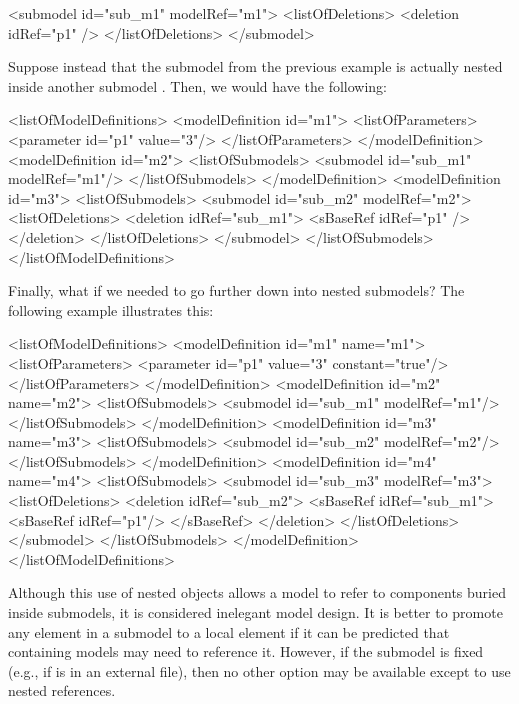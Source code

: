 \begin{example}
<submodel id="sub_m1" modelRef="m1">
  <listOfDeletions>
    <deletion idRef="p1" />
  </listOfDeletions>
</submodel>
\end{example}

Suppose instead that the submodel  from the previous example is actually nested inside another submodel .  Then, we would have the following:

\begin{example}
<listOfModelDefinitions>
  <modelDefinition id="m1">
    <listOfParameters>
      <parameter id="p1" value="3"/>
    </listOfParameters>
  </modelDefinition>
  <modelDefinition id="m2">
    <listOfSubmodels>
      <submodel id="sub_m1" modelRef="m1"/>
    </listOfSubmodels>    
  </modelDefinition>
  <modelDefinition id="m3">
    <listOfSubmodels>
      <submodel id="sub_m2" modelRef="m2">
        <listOfDeletions>
          <deletion idRef="sub_m1">
            <sBaseRef idRef="p1" />
          </deletion>
        </listOfDeletions>
      </submodel>
    </listOfSubmodels>    
</listOfModelDefinitions>
\end{example}

Finally, what if we needed to go further down into nested submodels? The following example illustrates this:

\begin{example}
<listOfModelDefinitions> 
  <modelDefinition id="m1" name="m1">
    <listOfParameters>
      <parameter id="p1" value="3" constant="true"/>
    </listOfParameters>
  </modelDefinition>
  <modelDefinition id="m2" name="m2">
    <listOfSubmodels>
      <submodel id="sub_m1" modelRef="m1"/>
    </listOfSubmodels>
  </modelDefinition>
  <modelDefinition id="m3" name="m3">
    <listOfSubmodels>
      <submodel id="sub_m2" modelRef="m2"/>
    </listOfSubmodels>
  </modelDefinition>
  <modelDefinition id="m4" name="m4">
    <listOfSubmodels>
      <submodel id="sub_m3" modelRef="m3">
        <listOfDeletions>
          <deletion idRef="sub_m2">
            <sBaseRef idRef="sub_m1">
              <sBaseRef idRef="p1"/>
            </sBaseRef>
          </deletion>
        </listOfDeletions>
      </submodel>
    </listOfSubmodels>
  </modelDefinition>
</listOfModelDefinitions> 
\end{example}


Although this use of nested \SBaseRef objects allows a model to refer to components buried inside submodels, it is considered inelegant model design.  It is better to promote any element in a submodel to a local element if it can be predicted that containing models may need to reference it.  However, if the submodel is fixed (e.g., if is in an external file), then no other option may be available except to use nested references. 

